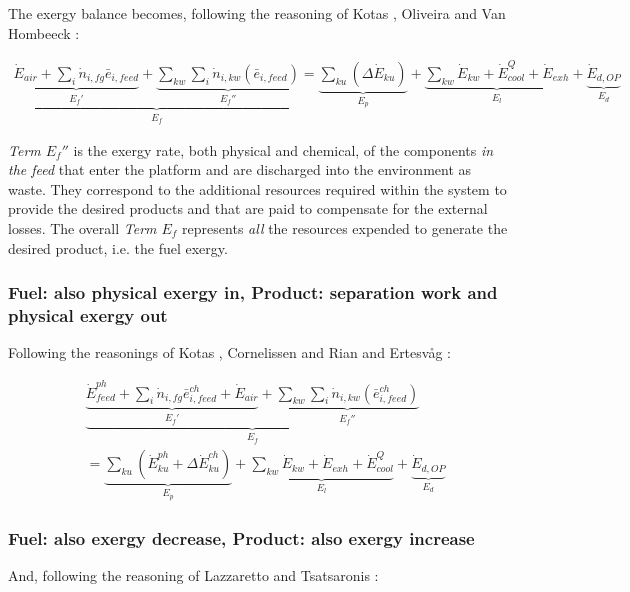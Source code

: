 The exergy balance becomes, following the reasoning of Kotas \cite{Kotas1995}, Oliveira and Van Hombeeck \cite{Oliveira1997}:

\begin{align}
	\underbrace{\underbrace{\dot{E}_{air}+\sum_i \dot{n}_{i,fg}\bar{e}_{i,feed}}_{E_f'}+\underbrace{\sum_{kw}\sum_i \dot{n}_{i,kw}(\bar{e}_{i,feed})}_{E_f''}}_{E_f}=\underbrace{\sum_{ku}\left(\Delta \dot{E}_{ku}\right)}_{E_p}+\underbrace{\sum_{kw} \dot{E}_{kw}+\dot{E}^{Q}_{cool}+\dot{E}_{exh}}_{E_l}+\underbrace{\dot{E}_{d,OP}}_{E_d}
\label{eq:oliveira_losses}
\end{align}

\emph{Term $E_f''$} is the exergy rate, both physical and chemical, of the components \emph{in the feed} that enter the platform and are discharged into the environment as waste. They correspond to the additional resources required within the system to provide the desired products and that are paid to compensate for the external losses. The overall \emph{Term $E_f$} represents \emph{all} the resources expended to generate the desired product, i.e. the fuel exergy.

\subsubsection{Fuel: also physical exergy in, Product: separation work and physical exergy out}

Following the reasonings of Kotas \cite{Kotas1995}, Cornelissen \cite{Cornelissen1997} and Rian and Ertesv\aa g \cite{Rian2012}:

\begin{align}
		&\underbrace{\underbrace{\dot{E}^{ph}_{feed}+\sum_i \dot{n}_{i,fg}\bar{e}^{ch}_{i,feed}+\dot{E}_{air}}_{E_f'}+\underbrace{\sum_{kw}\sum_i \dot{n}_{i,kw}(\bar{e}^{ch}_{i,feed})}_{E_f''}}_{E_f} \nonumber\\
		&=\underbrace{\sum_{ku}\left(\dot{E}^{ph}_{ku}+\Delta{\dot{E}}^{ch}_{ku}\right)}_{E_p}+\underbrace{\sum_{kw} \dot{E}_{kw}+\dot{E}_{exh}+\dot{E}^Q_{cool}}_{E_l}+\underbrace{\dot{E}_{d,OP}}_{E_d}
\label{eq:rian_losses}
\end{align}


\subsubsection{Fuel: also exergy decrease, Product: also exergy increase}

And, following the reasoning of Lazzaretto and Tsatsaronis \cite{Lazzaretto1999,Lazzaretto2006}:

